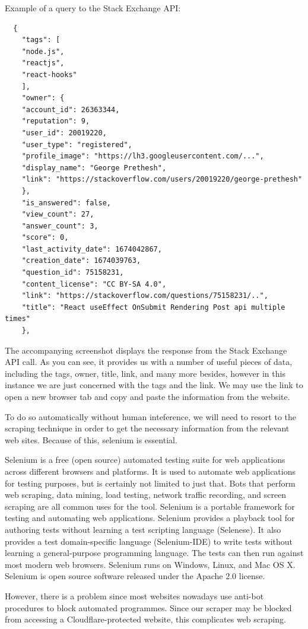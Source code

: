 \pagebreak
Example of a query to the Stack Exchange API:
\begin{lstlisting}
  {
    "tags": [
    "node.js",
    "reactjs",
    "react-hooks"
    ],
    "owner": {
    "account_id": 26363344,
    "reputation": 9,
    "user_id": 20019220,
    "user_type": "registered",
    "profile_image": "https://lh3.googleusercontent.com/...",
    "display_name": "George Prethesh",
    "link": "https://stackoverflow.com/users/20019220/george-prethesh"
    },
    "is_answered": false,
    "view_count": 27,
    "answer_count": 3,
    "score": 0,
    "last_activity_date": 1674042867,
    "creation_date": 1674039763,
    "question_id": 75158231,
    "content_license": "CC BY-SA 4.0",
    "link": "https://stackoverflow.com/questions/75158231/..",
    "title": "React useEffect OnSubmit Rendering Post api multiple times"
    },
\end{lstlisting}

The accompanying screenshot displays the response from the Stack Exchange API call. As you can see, it provides us with a number of useful pieces of data, including the tags, owner, title, link, and many more besides, however in this instance we are just concerned with the tags and the link. We may use the link to open a new browser tab and copy and paste the information from the website.

To do so automatically without human inteference, we will need to resort to the scraping technique in order to get the necessary information from the relevant web sites. Because of this, selenium is essential.

Selenium is a free (open source) automated testing suite for web applications across different browsers and platforms. It is used to automate web applications for testing purposes, but is certainly not limited to just that. Bots that perform web scraping, data mining, load testing, network traffic recording, and screen scraping are all common uses for the tool. Selenium is a portable framework for testing and automating web applications. Selenium provides a playback tool for authoring tests without learning a test scripting language (Selenese). It also provides a test domain-specific language (Selenium-IDE) to write tests without learning a general-purpose programming language. The tests can then run against most modern web browsers. Selenium runs on Windows, Linux, and Mac OS X. Selenium is open source software released under the Apache 2.0 license.

However, there is a problem since most websites nowadays use anti-bot procedures to block automated programmes. Since our scraper may be blocked from accessing a Cloudflare-protected website, this complicates web scraping.

